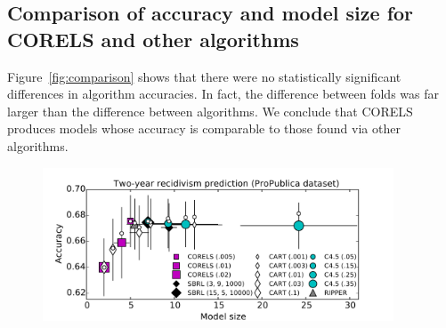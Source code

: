 \subsection{Comparison of accuracy and model size for CORELS and other algorithms}
\label{sec:sparsity}

Figure~\ref{fig:comparison} shows that there were no statistically significant
differences in algorithm accuracies.
In fact, the difference between folds was far larger than the difference
between algorithms.
We conclude that CORELS produces models whose accuracy is comparable
to those found via other algorithms.

\begin{figure}[t!]
\begin{center}
\includegraphics[trim={12mm, 0mm, 24mm, 5mm},
width=0.93\textwidth]{figs/compas-sparsity-training.pdf}
\vspace{6mm}


\end{center}
\end{figure}

